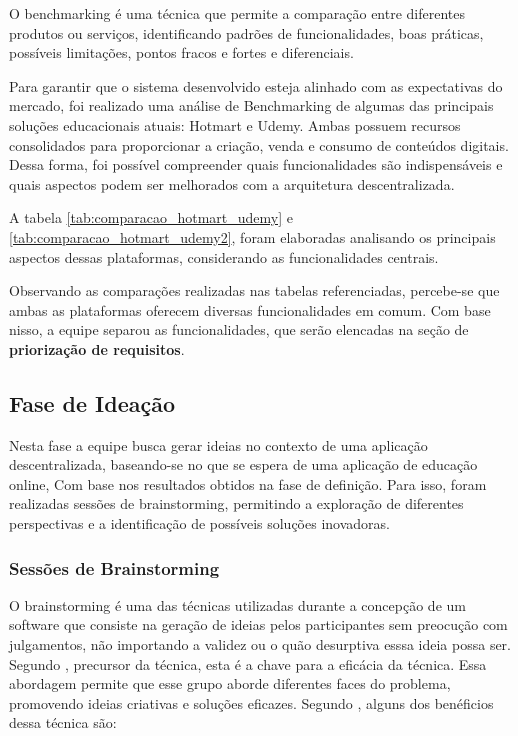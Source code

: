         O benchmarking é uma técnica que permite a comparação entre diferentes produtos ou serviços, identificando padrões de funcionalidades, boas práticas, possíveis limitações, pontos fracos e fortes e diferenciais.

        Para garantir que o sistema desenvolvido esteja alinhado com as expectativas do mercado, foi realizado uma análise de Benchmarking de algumas das principais soluções educacionais atuais: Hotmart e Udemy. Ambas possuem recursos consolidados para proporcionar a criação, venda e consumo de conteúdos digitais. Dessa forma, foi possível compreender quais funcionalidades são indispensáveis e quais aspectos podem ser melhorados com a arquitetura descentralizada.

        A tabela \ref{tab:comparacao_hotmart_udemy} e \ref{tab:comparacao_hotmart_udemy2}, foram elaboradas analisando os principais aspectos dessas plataformas, considerando as funcionalidades centrais.

        Observando as comparações realizadas nas tabelas referenciadas, percebe-se que ambas as plataformas oferecem diversas funcionalidades em comum. Com base nisso, a equipe separou as funcionalidades, que serão elencadas na seção de \textbf{priorização de requisitos}.

    \subsection{Fase de Ideação}
    Nesta fase a equipe busca gerar ideias no contexto de uma aplicação descentralizada, baseando-se no que se espera de uma aplicação de educação online, Com base nos resultados obtidos na fase de definição. Para isso, foram realizadas sessões de brainstorming, permitindo a exploração de diferentes perspectivas e a identificação de possíveis soluções inovadoras.

        \subsubsection{Sessões de Brainstorming}
        \label{brainstorming}
        O brainstorming é uma das técnicas utilizadas durante a concepção de um software que consiste na geração de ideias pelos participantes sem preocução com julgamentos, não importando a validez ou o quão desurptiva esssa ideia possa ser. Segundo \cite{osborn1953}, precursor da técnica, esta é a chave para a eficácia da técnica. 
        Essa abordagem permite que esse grupo aborde diferentes faces do problema, promovendo ideias criativas e soluções eficazes. Segundo \cite{miro2025}, alguns dos benéficios dessa técnica são:

